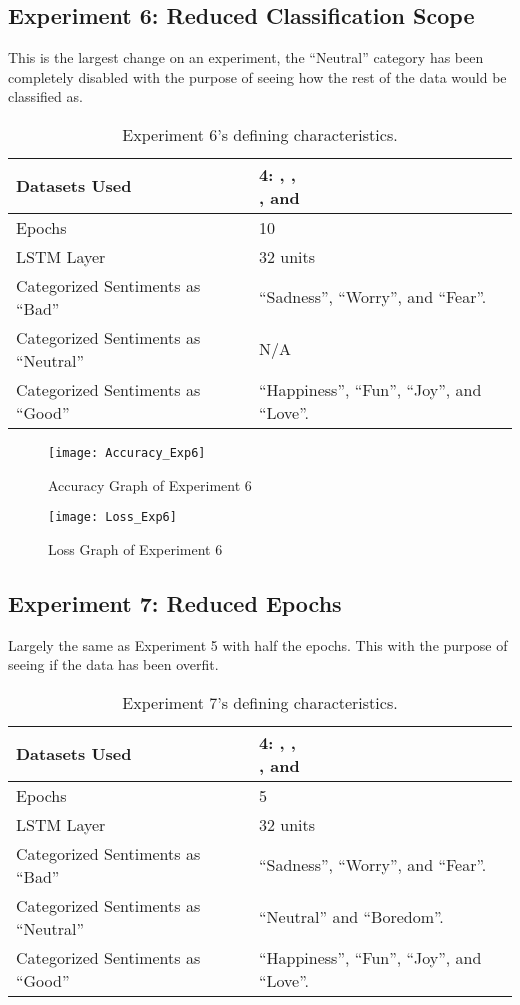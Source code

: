 \subsection{Experiment 6: Reduced Classification Scope}
\label{exp6}
This is the largest change on an experiment, the ``Neutral'' category has been completely disabled with the purpose of seeing how the rest of the data would be classified as.
\begin{table}[!h]
	\caption{Experiment 6's defining characteristics.}
	\vspace{0.5cm}
	\centering
	\begin{tabular}[t]{|l|l|}
	\hline
		Datasets Used & \makecell{4: \citet{d1}, \citet{d2},\\ \citet{d3}, and \citet{d4}}
	\\ \hline
		Epochs & 10
	\\ \hline
		LSTM Layer & 32 units
	\\ \hline
		Categorized Sentiments as ``Bad'' & ``Sadness'', ``Worry'', and ``Fear''.
	\\ \hline	
		 Categorized Sentiments as ``Neutral'' & N/A
	\\ \hline	
		Categorized Sentiments as ``Good'' & ``Happiness'', ``Fun'', ``Joy'', and ``Love''.
	\\ \hline
	\end{tabular}
\end{table}

\begin{figure}[!h]
	\centering
	\texttt{[image: Accuracy\_Exp6]}
	\caption{Accuracy Graph of Experiment 6}
	\label{fig:accuracy_exp6}
	\texttt{[image: Loss\_Exp6]}
	\caption{Loss Graph of Experiment 6}
	\label{fig:loss_exp6}
\end{figure}
\pagebreak

\subsection{Experiment 7: Reduced Epochs}
\label{exp7}
Largely the same as Experiment 5 with half the epochs. This with the purpose of seeing if the data has been overfit.
\begin{table}[!h]
	\caption{Experiment 7's defining characteristics.}
	\vspace{0.5cm}
	\centering
	\begin{tabular}[t]{|l|l|}
	\hline
		Datasets Used & \makecell{4: \citet{d1}, \citet{d2},\\ \citet{d3}, and \citet{d4}}
	\\ \hline
		Epochs & 5
	\\ \hline
		LSTM Layer & 32 units
	\\ \hline
		Categorized Sentiments as ``Bad'' & ``Sadness'', ``Worry'', and ``Fear''.
	\\ \hline	
		 Categorized Sentiments as ``Neutral'' & ``Neutral'' and ``Boredom''.
	\\ \hline	
		Categorized Sentiments as ``Good'' & ``Happiness'', ``Fun'', ``Joy'', and ``Love''.
	\\ \hline
	\end{tabular}
\end{table}


